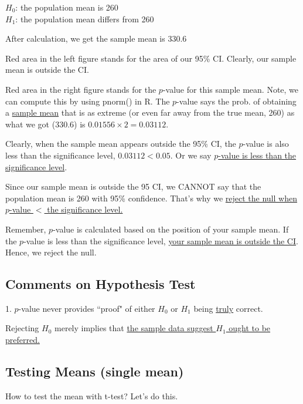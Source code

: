 \documentclass[12pt]{article}
\begin{document}
$ H_0 $: the population mean is 260\\
$ H_1 $: the population mean differs from 260

After calculation, we get the sample mean is $ 330.6 $

Red area in the left figure stands for the area of our 95\% CI.
Clearly, our sample mean is outside the CI.

Red area in the right figure stands for the $ p $-value for this sample
mean. Note, we can compute this by using pnorm() in R.
The $ p $-value says the prob. of obtaining a {\underline {sample mean}}
that is as extreme (or even far away from the true mean, 260) as what
we got (330.6) is $ 0.01556  \times 2 = 0.03112 $.


Clearly, when the sample mean appears outside the 95\% CI, the
$ p $-value is also less than the significance level, 
$ 0.03112 < 0.05 $. Or we say 
{\underline {$ p $-value is less than the significance level}}.


Since our sample mean is outside the 95 CI, we CANNOT say that
the population mean is 260 with 95\% confidence. That's why we 
{\underline {reject the null when $ p $-value $ < $ the 
significance level.}}


Remember, $ p $-value is calculated based on the position of your
sample mean. If the $ p $-value is less than the significance level, 
{\underline {your sample mean is outside the CI}}. Hence, we 
reject the null.


\subsection{Comments on Hypothesis Test}

1. $ p $-value never provides ``proof" of either $ H_0 $ or $ H_1 $ being
{\underline {truly}} correct.

Rejecting $ H_0 $ merely implies that {\underline {the sample data
suggest $ H_1 $ ought to be preferred.}}\\










\subsection{Testing Means (single mean)}

How to test the mean with t-test? Let's do this.
\end{document}
